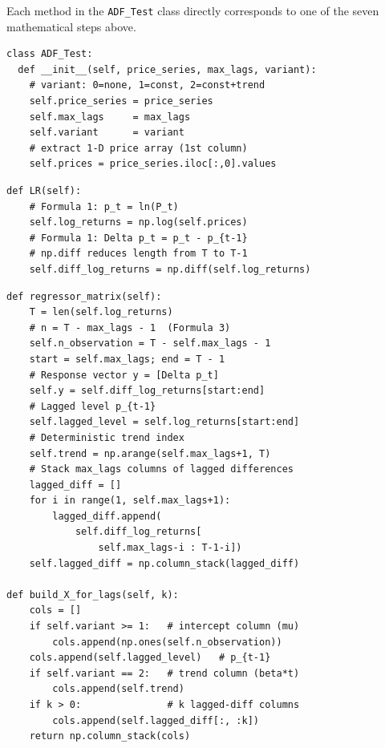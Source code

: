 \documentclass[10pt,a4paper,twocolumn]{article}
\begin{document}
Each method in the \texttt{ADF\_Test} class directly corresponds to
one of the seven mathematical steps above.

\begin{tcolorbox}[codebox={Constructor --- \texttt{\_\_init\_\_()}}]
\begin{lstlisting}[style=pythonplain]
class ADF_Test:
  def __init__(self, price_series, max_lags, variant):
    # variant: 0=none, 1=const, 2=const+trend
    self.price_series = price_series
    self.max_lags     = max_lags
    self.variant      = variant
    # extract 1-D price array (1st column)
    self.prices = price_series.iloc[:,0].values
\end{lstlisting}
\end{tcolorbox}

\begin{tcolorbox}[codebox={Step 1 --- \texttt{LR()} (log-prices \& differences)}]
\begin{lstlisting}[style=pythonplain]
def LR(self):
    # Formula 1: p_t = ln(P_t)
    self.log_returns = np.log(self.prices)
    # Formula 1: Delta p_t = p_t - p_{t-1}
    # np.diff reduces length from T to T-1
    self.diff_log_returns = np.diff(self.log_returns)
\end{lstlisting}
\end{tcolorbox}

\begin{tcolorbox}[codebox={Steps 2--3 --- \texttt{regressor\_matrix()}}]
\begin{lstlisting}[style=pythonplain]
def regressor_matrix(self):
    T = len(self.log_returns)
    # n = T - max_lags - 1  (Formula 3)
    self.n_observation = T - self.max_lags - 1
    start = self.max_lags; end = T - 1
    # Response vector y = [Delta p_t]
    self.y = self.diff_log_returns[start:end]
    # Lagged level p_{t-1}
    self.lagged_level = self.log_returns[start:end]
    # Deterministic trend index
    self.trend = np.arange(self.max_lags+1, T)
    # Stack max_lags columns of lagged differences
    lagged_diff = []
    for i in range(1, self.max_lags+1):
        lagged_diff.append(
            self.diff_log_returns[
                self.max_lags-i : T-1-i])
    self.lagged_diff = np.column_stack(lagged_diff)

def build_X_for_lags(self, k):
    cols = []
    if self.variant >= 1:   # intercept column (mu)
        cols.append(np.ones(self.n_observation))
    cols.append(self.lagged_level)   # p_{t-1}
    if self.variant == 2:   # trend column (beta*t)
        cols.append(self.trend)
    if k > 0:               # k lagged-diff columns
        cols.append(self.lagged_diff[:, :k])
    return np.column_stack(cols)
\end{lstlisting}
\end{tcolorbox}
\end{document}
